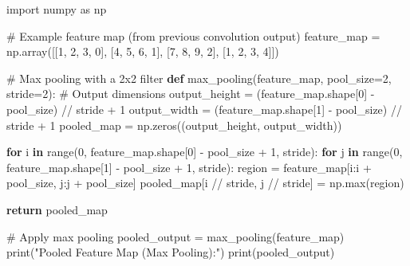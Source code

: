 \documentclass[
  letterpaper,
  DIV=11,
  numbers=noendperiod]{scrreprt}
\newenvironment{Shaded}{\begin{snugshade}}{\end{snugshade}}
\newcommand{\BuiltInTok}[1]{\textcolor[rgb]{0.00,0.23,0.31}{#1}}
\newcommand{\CommentTok}[1]{\textcolor[rgb]{0.37,0.37,0.37}{#1}}
\newcommand{\ControlFlowTok}[1]{\textcolor[rgb]{0.00,0.23,0.31}{\textbf{#1}}}
\newcommand{\DecValTok}[1]{\textcolor[rgb]{0.68,0.00,0.00}{#1}}
\newcommand{\ImportTok}[1]{\textcolor[rgb]{0.00,0.46,0.62}{#1}}
\newcommand{\KeywordTok}[1]{\textcolor[rgb]{0.00,0.23,0.31}{\textbf{#1}}}
\newcommand{\NormalTok}[1]{\textcolor[rgb]{0.00,0.23,0.31}{#1}}
\newcommand{\OperatorTok}[1]{\textcolor[rgb]{0.37,0.37,0.37}{#1}}
\newcommand{\StringTok}[1]{\textcolor[rgb]{0.13,0.47,0.30}{#1}}
\begin{document}
\begin{Shaded}
\begin{Highlighting}[]
\ImportTok{import}\NormalTok{ numpy }\ImportTok{as}\NormalTok{ np}

\CommentTok{\# Example feature map (from previous convolution output)}
\NormalTok{feature\_map }\OperatorTok{=}\NormalTok{ np.array([[}\DecValTok{1}\NormalTok{, }\DecValTok{2}\NormalTok{, }\DecValTok{3}\NormalTok{, }\DecValTok{0}\NormalTok{],}
\NormalTok{                        [}\DecValTok{4}\NormalTok{, }\DecValTok{5}\NormalTok{, }\DecValTok{6}\NormalTok{, }\DecValTok{1}\NormalTok{],}
\NormalTok{                        [}\DecValTok{7}\NormalTok{, }\DecValTok{8}\NormalTok{, }\DecValTok{9}\NormalTok{, }\DecValTok{2}\NormalTok{],}
\NormalTok{                        [}\DecValTok{1}\NormalTok{, }\DecValTok{2}\NormalTok{, }\DecValTok{3}\NormalTok{, }\DecValTok{4}\NormalTok{]])}

\CommentTok{\# Max pooling with a 2x2 filter}
\KeywordTok{def}\NormalTok{ max\_pooling(feature\_map, pool\_size}\OperatorTok{=}\DecValTok{2}\NormalTok{, stride}\OperatorTok{=}\DecValTok{2}\NormalTok{):}
    \CommentTok{\# Output dimensions}
\NormalTok{    output\_height }\OperatorTok{=}\NormalTok{ (feature\_map.shape[}\DecValTok{0}\NormalTok{] }\OperatorTok{{-}}\NormalTok{ pool\_size) }\OperatorTok{//}\NormalTok{ stride }\OperatorTok{+} \DecValTok{1}
\NormalTok{    output\_width }\OperatorTok{=}\NormalTok{ (feature\_map.shape[}\DecValTok{1}\NormalTok{] }\OperatorTok{{-}}\NormalTok{ pool\_size) }\OperatorTok{//}\NormalTok{ stride }\OperatorTok{+} \DecValTok{1}
\NormalTok{    pooled\_map }\OperatorTok{=}\NormalTok{ np.zeros((output\_height, output\_width))}

    \ControlFlowTok{for}\NormalTok{ i }\KeywordTok{in} \BuiltInTok{range}\NormalTok{(}\DecValTok{0}\NormalTok{, feature\_map.shape[}\DecValTok{0}\NormalTok{] }\OperatorTok{{-}}\NormalTok{ pool\_size }\OperatorTok{+} \DecValTok{1}\NormalTok{, stride):}
        \ControlFlowTok{for}\NormalTok{ j }\KeywordTok{in} \BuiltInTok{range}\NormalTok{(}\DecValTok{0}\NormalTok{, feature\_map.shape[}\DecValTok{1}\NormalTok{] }\OperatorTok{{-}}\NormalTok{ pool\_size }\OperatorTok{+} \DecValTok{1}\NormalTok{, stride):}
\NormalTok{            region }\OperatorTok{=}\NormalTok{ feature\_map[i:i }\OperatorTok{+}\NormalTok{ pool\_size, j:j }\OperatorTok{+}\NormalTok{ pool\_size]}
\NormalTok{            pooled\_map[i }\OperatorTok{//}\NormalTok{ stride, j }\OperatorTok{//}\NormalTok{ stride] }\OperatorTok{=}\NormalTok{ np.}\BuiltInTok{max}\NormalTok{(region)}

    \ControlFlowTok{return}\NormalTok{ pooled\_map}

\CommentTok{\# Apply max pooling}
\NormalTok{pooled\_output }\OperatorTok{=}\NormalTok{ max\_pooling(feature\_map)}
\BuiltInTok{print}\NormalTok{(}\StringTok{"Pooled Feature Map (Max Pooling):"}\NormalTok{)}
\BuiltInTok{print}\NormalTok{(pooled\_output)}
\end{Highlighting}
\end{Shaded}
\end{document}
